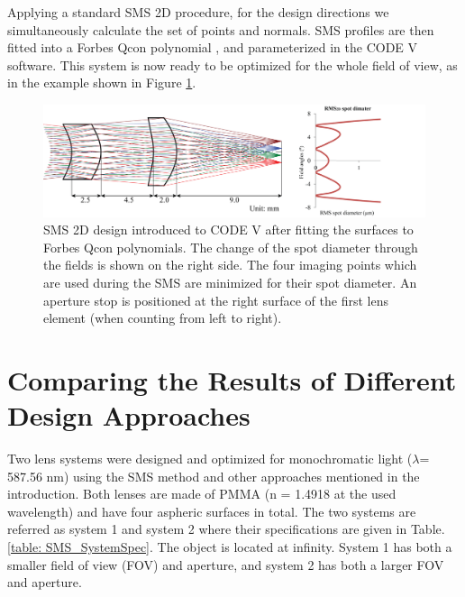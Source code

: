 Applying a standard SMS 2D procedure, for the design directions we simultaneously calculate the set of points and normals. SMS profiles are then fitted into a Forbes Qcon polynomial \cite{ForbesOE07}, and parameterized in the CODE V software. This system is now ready to be optimized for the whole field of view, as in the example shown in Figure \ref{fig: fig2_SMSdesignedSys}. 

\begin{figure}[h!]
    \centering
    \includegraphics[width=1\textwidth]{chapter-5/figures/Fig2_SMSdesignedSystem.png}
    \caption{SMS 2D design introduced to CODE V after fitting the surfaces to Forbes Qcon polynomials. The change of the spot diameter through the fields is shown on the right side. The four imaging points which are used during the SMS are minimized for their spot diameter. An aperture stop is positioned at the right surface of the first lens element (when counting from left to right).  }
    \label{fig: fig2_SMSdesignedSys}
\end{figure}

\section{Comparing the Results of Different Design Approaches}
Two lens systems were designed and optimized for monochromatic light ($\lambda$= 587.56 nm) using the SMS method and other approaches mentioned in the introduction. Both lenses are made of PMMA (n = 1.4918 at the used wavelength) and have four aspheric surfaces in total. The two systems are referred as system 1 and system 2 where their specifications are given in Table. \ref{table: SMS_SystemSpec}. The object is located at infinity. System 1 has both a smaller field of view (FOV) and aperture, and system 2 has both a larger FOV and aperture. 

